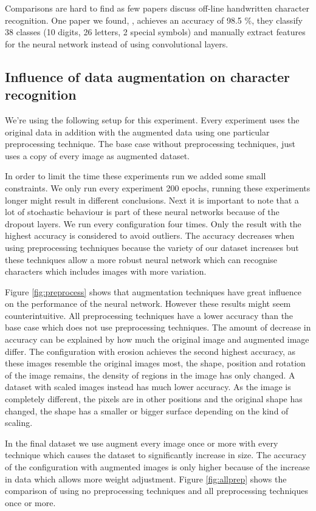 \documentclass{article}
\begin{document}
Comparisons are hard to find as few papers discuss off-line handwritten character recognition.
One paper we found, \cite{charrec}, achieves an accuracy of 98.5 \%, they classify 38 classes (10 digits, 26 letters, 2 special symbols) and manually extract features for the neural network instead of using convolutional layers. 

\subsection{Influence of data augmentation on character recognition}

We're using the following setup for this experiment. Every experiment uses the original data in addition with the augmented data using one particular preprocessing technique. The base case without preprocessing techniques, just uses a copy of every image as augmented dataset. 

In order to limit the time these experiments run we added some small constraints. We only run every experiment 200 epochs, running these experiments longer might result in different conclusions. 
Next it is important to note that a lot of stochastic behaviour is part of these neural networks because of the dropout layers. We run every configuration four times. Only the result with the highest accuracy is considered to avoid outliers. 
The accuracy decreases when using preprocessing techniques because the variety of our dataset increases but these techniques allow a more robust neural network which can recognise characters which includes images with more variation. 

Figure \ref{fig:preprocess} shows that augmentation techniques have great influence on the performance of the neural network. However these results might seem counterintuitive. 
All preprocessing techniques have a lower accuracy than the base case which does not use preprocessing techniques. The amount of decrease in accuracy can be explained by how much the original image and augmented image differ. The configuration with erosion achieves the second highest accuracy, as these images resemble the original images most, the shape, position and rotation of the image remains, the density of regions in the image has only changed. A dataset with scaled images instead has much lower accuracy. As the image is completely different, the pixels are in other positions and the original shape has changed, the shape has a smaller or bigger surface depending on the kind of scaling. 

In the final dataset we use augment every image once or more with every technique which causes the dataset to significantly increase in size. The accuracy of the configuration with augmented images is only higher because of the increase in data which allows more weight adjustment. Figure \ref{fig:allprep} shows the comparison of using no preprocessing techniques and all preprocessing techniques once or more. 
\end{document}
